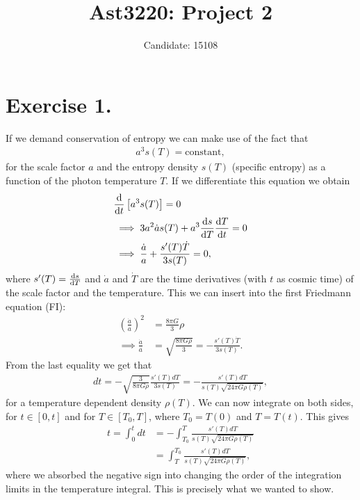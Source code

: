 \documentclass{emulateapj}
\begin{document}
	
	\title{Ast3220: Project 2}
	
	\author{Candidate: 15108}
	
	
	\section*{Exercise 1.}
	If we demand conservation of entropy we can make use of the fact that 
	\begin{align}
		a^3s(T) = \text{constant},
	\end{align}
	for the scale factor $a$ and the entropy density $s(T)$ (specific entropy) as a function of the photon temperature $T$. If we differentiate this equation we obtain 
	\begin{align}
		&\dv{t}\left[a^3s(T)\right] = 0\\
		&\implies 3a^2\dot{a}s(T) + a^3\dv{s}{T}\dv{T}{t} = 0\\
		&\implies \frac{\dot{a}}{a} + \frac{s'(T)\dot{T}}{3s(T)} = 0,
	\end{align}
	where $s'(T) = \dv{s}{T}$ and $\dot{a}$ and $\dot{T}$ are the time derivatives (with $t$ as cosmic time) of the scale factor and the temperature.
	This we can insert into the first Friedmann equation (FI):
	\begin{align}
		\left(\frac{\dot{a}}{a}\right)^2 &= \frac{8\pi G}{3}\rho\\
		\implies \frac{\dot{a}}{a} &= \sqrt{\frac{8\pi G\rho}{3}} = -\frac{s'(T)\dot{T}}{3s(T)}.
	\end{align}
	From the last equality we get that 
	\begin{align}
		dt = -\sqrt{\frac{3}{8\pi G\rho}}\frac{s'(T)dT}{3s(T)} = -\frac{s'(T)dT}{s(T)\sqrt{24\pi G\rho(T)}},
	\end{align}
	for a temperature dependent density $\rho(T)$. We can now integrate on both sides, for $t\in[0, t]$ and for $T\in[T_0, T]$, where $T_0 = T(0)$ and $T = T(t)$. This gives 
	\begin{align}
		t = \int_{0}^{t}dt &= -\int_{T_0}^{T}\frac{s'(T)dT}{s(T)\sqrt{24\pi G\rho(T)}}\nonumber \\
		&=\int_{T}^{T_0}\frac{s'(T)dT}{s(T)\sqrt{24\pi G\rho(T)}},
	\end{align}
	where we absorbed the negative sign into changing the order of the integration limits in the temperature integral. This is precisely what we wanted to show.
	
\end{document}
